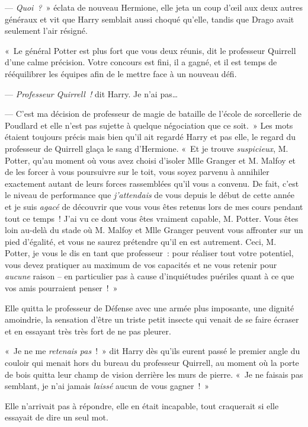 --- \emph{Quoi~?}~» éclata de nouveau Hermione, elle jeta un coup d'œil aux deux autres généraux et vit que Harry semblait aussi choqué qu'elle, tandis que Drago avait seulement l'air résigné.

«~Le général Potter est plus fort que vous deux réunis, dit le professeur Quirrell d'une calme précision. Votre concours est fini, il a gagné, et il est temps de rééquilibrer les équipes afin de le mettre face à un nouveau défi.

--- \emph{Professeur Quirrell~!} dit Harry. Je n'ai pas…

--- C'est ma décision de professeur de magie de bataille de l'école de sorcellerie de Poudlard et elle n'est pas sujette à quelque négociation que ce soit.~» Les mots étaient toujours précis mais bien qu'il ait regardé Harry et pas elle, le regard du professeur de Quirrell glaça le sang d'Hermione. «~Et je trouve \emph{suspicieux}, M. Potter, qu'au moment où vous avez choisi d'isoler Mlle Granger et M. Malfoy et de les forcer à vous poursuivre sur le toit, vous soyez parvenu à annihiler exactement autant de leurs forces rassemblées qu'il vous a convenu. De fait, c'est le niveau de performance que \emph{j'attendais} de vous depuis le début de cette année et je suis \emph{agacé} de découvrir que vous vous êtes retenus lors de mes cours pendant tout ce temps~! J'ai vu ce dont vous êtes vraiment capable, M. Potter. Vous êtes loin au-delà du stade où M. Malfoy et Mlle Granger peuvent vous affronter sur un pied d'égalité, et vous ne saurez prétendre qu'il en est autrement. Ceci, M. Potter, je vous le dis en tant que professeur~: pour réaliser tout votre potentiel, vous devez pratiquer au maximum de vos capacités et ne vous retenir pour \emph{aucune} raison -- en particulier pas à cause d'inquiétudes puériles quant à ce que vos amis pourraient penser~!~»

\later

Elle quitta le professeur de Défense avec une armée plus imposante, une dignité amoindrie, la sensation d'être un triste petit insecte qui venait de se faire écraser et en essayant très très fort de ne pas pleurer.

«~Je ne me \emph{retenais pas}~!~» dit Harry dès qu'ils eurent passé le premier angle du couloir qui menait hors du bureau du professeur Quirrell, au moment où la porte de bois quitta leur champ de vision derrière les murs de pierre. «~Je ne faisais pas semblant, je n'ai jamais \emph{laissé} aucun de vous gagner~!~»

Elle n'arrivait pas à répondre, elle en était incapable, tout craquerait si elle essayait de dire un seul mot.

